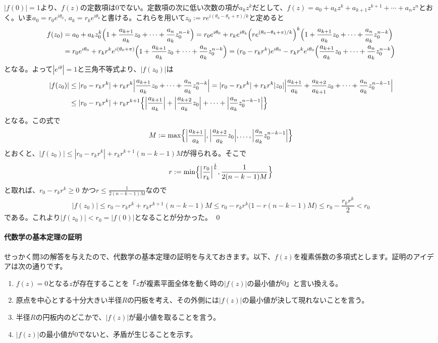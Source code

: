 $|f(0)|=1$より、$f(z)$の定数項は$0$でない。定数項の次に低い次数の項が$a_k z^k$だとして、$f(z) = a_0 + a_k z^k + a_{k+1} z^{k+1} + \cdots + a_n z^n$とおく。いま$a_0 = r_0 e^{i\theta_0}$, $a_k = r_k e^{i\theta_k}$と書ける。これらを用いて$z_0:=re^{i(\theta_0-\theta_k+\pi)/k}$と定めると
\begin{align*}
f(z_0) &= a_0 + a_k z_0^k \Bigl( 1 + \frac{a_{k+1}}{a_k} z_0 + \cdots + \frac{a_n}{a_k} z_0^{n-k}\Bigr)
= r_0e^{i\theta_0} + r_k e^{i\theta_k} \Bigl(re^{(\theta_0-\theta_k+\pi)/k}\Bigr)^k \Bigl( 1 + \frac{a_{k+1}}{a_k} z_0 + \cdots + \frac{a_n}{a_k} z_0^{n-k}\Bigr)\\
&= r_0e^{i\theta_0} + r_k r^k e^{i(\theta_0+\pi)} \Bigl( 1 + \frac{a_{k+1}}{a_k} z_0 + \cdots + \frac{a_n}{a_k} z_0^{n-k}\Bigr)
= (r_0-r_kr^k) e^{i\theta_0} - r_k r^k e^{i\theta_0} \Bigl( \frac{a_{k+1}}{a_k} z_0 + \cdots + \frac{a_n}{a_k} z_0^{n-k}\Bigr)
\end{align*}
となる。よって$|e^{i\theta}|=1$と三角不等式より、$|f(z_0)|$は
\begin{align*}
|f(z_0)| &\leq |r_0-r_k r^k | + r_k r^k \Bigl| \frac{a_{k+1}}{a_k} z_0 + \cdots + \frac{a_n}{a_k} z_0^{n-k}\Bigr|
= |r_0-r_k r^k| + r_k r^k|z_0| \Bigl| \frac{a_{k+1}}{a_k} + \frac{a_{k+2}}{a_{k+1}}z_0  + \cdots + \frac{a_n}{a_k} z_0^{n-k-1}\Bigr| \\
&\leq |r_0-r_k r^k| + r_k r^{k+1}\Bigl\{\Bigl|\frac{a_{k+1}}{a_k}\Bigr| + \Bigl|\frac{a_{k+2}}{a_k} z_0\Bigr| + \cdots + \Bigl|\frac{a_{n}}{a_k} z_0^{n-k-1}\Bigr|\Bigr\}
\end{align*}
となる。この式で
\[
M := \max\Bigl\{\Bigl|\frac{a_{k+1}}{a_k}\Bigr|, \Bigl|\frac{a_{k+2}}{a_k} z_0\Bigr|, \ldots, \Bigl|\frac{a_{n}}{a_k} z_0^{n-k-1}\Bigr|\Bigr\}
\]
とおくと、$|f(z_0)|\leq |r_0-r_kr^k| + r_k r^{k+1}(n-k-1)M$が得られる。そこで
\[
r := \min\Bigl\{\Bigl|\frac{r_0}{r_k}\Bigr|^{\frac{1}{k}} , \frac{1}{2(n-k-1)M}\Bigr\}
\]
と取れば、$ r_0-r_k r^k \geq 0 $ かつ$ r \leq \frac{1}{2(n-k-1)M} $なので
\[
|f(z_0)|\leq r_0 - r_k r^k + r_k r^{k+1}(n-k-1)M \leq r_0 - r_k r^k \bigl( 1 - r(n-k-1)M\bigr)
\leq r_0 - \frac{r_k r^k}{2} < r_0
\]
である。これより$|f(z_0)|<r_0=|f(0)|$となることが分かった。 \qed


\paragraph{代数学の基本定理の証明}

せっかく問$3$の解答を与えたので、代数学の基本定理の証明を与えておきます。以下、$f(z)$を複素係数の多項式とします。証明のアイデアは次の通りです。
\begin{enumerate}
\item $f(z)=0$となる$z$が存在することを「$z$が複素平面全体を動く時の$|f(z)|$の最小値が$0$」と言い換える。
\item 原点を中心とする十分大きい半径$R$の円板を考え、その外側には$|f(z)|$の最小値が決して現れないことを言う。
\item 半径$R$の円板内のどこかで、$|f(z)|$が最小値を取ることを言う。
\item $|f(z)|$の最小値が$0$でないと、矛盾が生じることを示す。
\end{enumerate}


